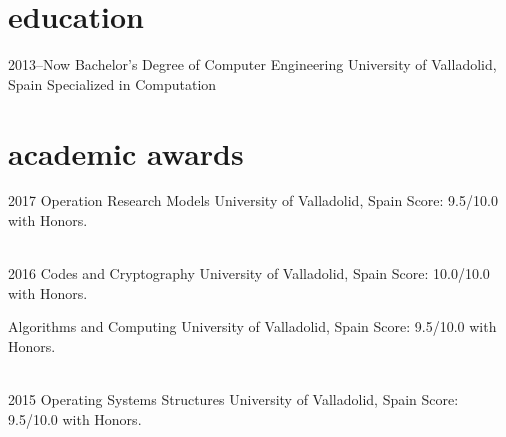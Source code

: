 \documentclass[]{friggeri-cv} %
\begin{document}



    \section{education}

        \begin{entrylist}

            \entry
            {2013--Now}
            {Bachelor's Degree {\normalfont of Computer Engineering}}
            {University of Valladolid, Spain}
            {Specialized in Computation}

        \end{entrylist}




    \section{academic awards}

        \begin{entrylist}

            \entry
            {2017}
            {Operation Research Models}
            {University of Valladolid, Spain}
            {Score: 9.5/10.0 with Honors.}

            \\
            \entry
            {2016}
            {Codes and Cryptography}
            {University of Valladolid, Spain}
            {Score: 10.0/10.0 with Honors.}

            \entry
            {}
            {Algorithms and Computing}
            {University of Valladolid, Spain}
            {Score: 9.5/10.0 with Honors.}

            \\
            \entry
            {2015}
            {Operating Systems Structures}
            {University of Valladolid, Spain}
            {Score: 9.5/10.0 with Honors.}

        \end{entrylist}
\end{document}
